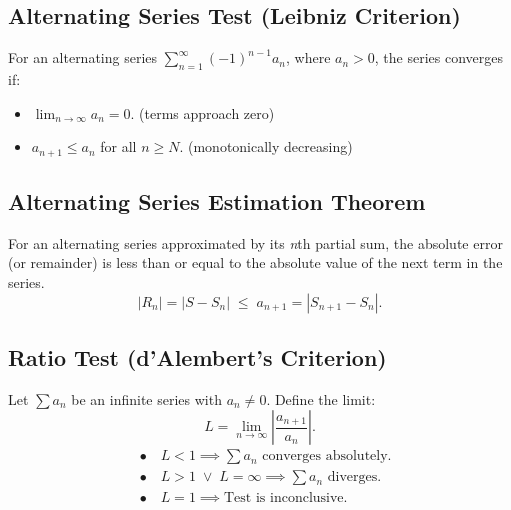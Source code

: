 \documentclass[a4paper,11pt]{article}
\begin{document}


\subsection{Alternating Series Test (Leibniz Criterion)}

\begin{tcolorbox}
    For an alternating series $\sum_{n=1}^{\infty} (-1)^{n-1} a_n$, where $a_n > 0$, the series converges if:
    \begin{itemize}
        \item $\lim_{n \to \infty} a_n = 0$. (terms approach zero)
        \item $a_{n+1} \leq a_n$ for all $n \geq N$. (monotonically decreasing)
    \end{itemize}
\end{tcolorbox}




\subsection{Alternating Series Estimation Theorem}

\begin{tcolorbox}
    For an alternating series approximated by its \emph{n}th partial sum, the absolute error (or remainder) is less than or equal to the absolute value of the next term in the series.
    \[
    |R_n| = |S - S_n| \; \leq \; a_{n+1} = |S_{n+1} - S_n|.
    \]
\end{tcolorbox}




\subsection{Ratio Test (d'Alembert's Criterion)}

\begin{tcolorbox}
    Let $\textstyle \sum a_n$ be an infinite series with $a_n \neq 0$. Define the limit:
    \[
    L = \lim_{n \to \infty} \left| \frac{a_{n+1}}{a_n} \right|.
    \]
    \[
    \begin{aligned}
        &\bullet \quad L < 1 \implies \sum a_n \text{ converges absolutely}. \\[8pt]  
        &\bullet \quad L > 1 \; \lor \; L = \infty \implies \sum a_n \text{ diverges}. \\[8pt]
        &\bullet \quad L = 1 \implies \text{Test is inconclusive}.
    \end{aligned}
    \]
\end{tcolorbox}
\end{document}
